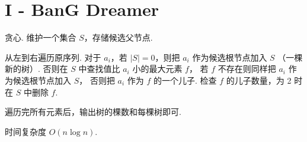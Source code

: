 \documentclass{ctexart}
\begin{document}
\section*{I - BanG Dreamer}

贪心. 维护一个集合 $S$，存储候选父节点.

从左到右遍历原序列.
对于 $a_i$，若 $|S| = 0$，则把 $a_i$ 作为候选根节点加入 $S$ （一棵新的树）.
否则在 $S$ 中查找值比 $a_i$ 小的最大元素 $f$，
若 $f$ 不存在则同样把 $a_i$ 作为候选根节点加入 $S$，
否则把 $a_i$ 作为 $f$ 的一个儿子. 
检查 $f$ 的儿子数量，为 2 时在 $S$ 中删除 $f$.

遍历完所有元素后，输出树的棵数和每棵树即可.

时间复杂度 $O(n\log{n})$.
\end{document}
